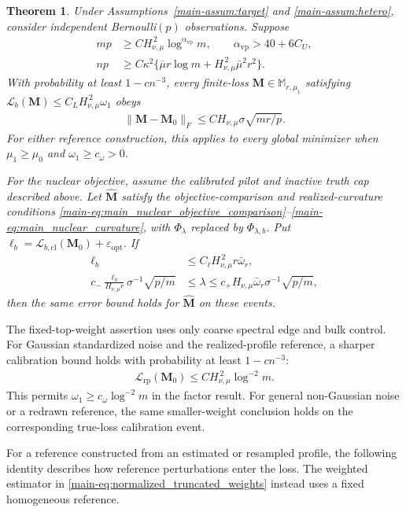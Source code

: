 \documentclass[numsec,webpdf,modern,large,namedate]{oup-authoring-template}
\theoremstyle{plain}
\newtheorem{stheorem}{Theorem}%
\theoremstyle{remark}
\newcommand{\M}{\bm{M}}
\newif\ifmarkchanges
\newenvironment{revision}{\begingroup\ifmarkchanges\color{red}\fi}{\endgroup}
\begin{document}
\begin{revision}
\begin{stheorem}
\label{thm:hetero_upper_bounds}
Under Assumptions~\ref{main-assum:target} and \ref{main-assum:hetero}, consider
independent Bernoulli$(p)$ observations. Suppose
\begin{align*}
 mp&\ge C H_{\nu,\mu}^{\,2}\log^{\alpha_{\mathrm{vp}}}m,
 \qquad\alpha_{\mathrm{vp}}>40+6C_U,\\
 np&\ge C\kappa^2\{\bar\mu r\log m+
                      H_{\nu,\mu}^{\,2}\bar\mu^2r^2\}.
\end{align*}
With probability at least $1-cn^{-3}$, every finite-loss
$\M\in\mathbb M_{r,\mu_1}$ satisfying
$\mathcal L_b(\M)\le C_LH_{\nu,\mu}^{\,2}\omega_1$ obeys
\begin{align*}
 \|\M-\M_0\|_F\le C H_{\nu,\mu}\sigma\sqrt{mr/p}.
\end{align*}
For either reference construction, this applies to every global minimizer
when $\mu_1\ge\mu_0$ and $\omega_1\ge c_\omega>0$.

For the nuclear objective, assume the calibrated pilot and inactive
truth cap described above. Let $\widehat{\M}$ satisfy the objective-comparison
and realized-curvature conditions
\eqref{main-eq:main_nuclear_objective_comparison}--\eqref{main-eq:main_nuclear_curvature},
with $\Phi_\lambda$ replaced by $\Phi_{\lambda,b}$.
Put $\ell_b=\mathcal L_{b,\mathrm{cl}}(\M_0)+\varepsilon_{\mathrm{opt}}$.
If
\begin{align*}
 \ell_b&\le C_\ell H_{\nu,\mu}^{\,2}r\bar\omega_r,\\
 c_-\frac{\ell_b}{H_{\nu,\mu}r}\sigma^{-1}\sqrt{p/m}
 &\le\lambda\le
 c_+H_{\nu,\mu}\bar\omega_r\sigma^{-1}\sqrt{p/m},
\end{align*}
then the same error bound holds for $\widehat{\M}$ on these events.
\end{stheorem}
The fixed-top-weight assertion uses only coarse spectral edge and bulk
control. For Gaussian standardized noise and the realized-profile
reference, a sharper calibration bound holds with probability at least
$1-cn^{-3}$:
\begin{align}
 \mathcal L_{\mathrm{rp}}(\M_0)
 \le C H_{\nu,\mu}^{\,2}\log^{-2}m.
 \label{eq:main_profile_fine_calibration}
\end{align}
This permits $\omega_1\ge c_\omega\log^{-2}m$ in the factor result.
For general non-Gaussian noise or a redrawn reference, the same smaller-weight
conclusion holds on the corresponding true-loss calibration event.

For a reference constructed from an estimated or resampled profile, the following identity describes how reference perturbations enter the loss. The weighted estimator in \eqref{main-eq:normalized_truncated_weights} instead uses a fixed homogeneous reference.


\end{revision}
\end{document}
